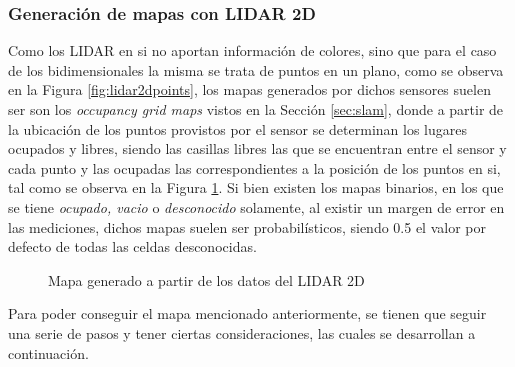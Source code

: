 \subsubsection{Generación de mapas con LIDAR 2D}
Como los LIDAR en si no aportan información de colores, sino que para el caso de los bidimensionales la misma se trata de puntos en un plano, como se observa en la Figura \ref{fig:lidar2dpoints}, los mapas generados por dichos sensores suelen ser son los \textit{occupancy grid maps} vistos en la Sección \ref{sec:slam}, donde a partir de la ubicación de los puntos provistos por el sensor se determinan los lugares ocupados y libres, siendo las casillas libres las que se encuentran entre el sensor y cada punto y las ocupadas las correspondientes a la posición de los puntos en si, tal como se observa en la Figura \ref{fig:lidar2dmap}. Si bien existen los mapas binarios, en los que se tiene \textit{ocupado, vacio} o \textit{desconocido} solamente, al existir un margen de error en las mediciones, dichos mapas suelen ser probabilísticos, siendo 0.5 el valor por defecto de todas las celdas desconocidas.

\begin{figure}[!ht]
    \caption{Mapa generado a partir de los datos del LIDAR 2D}
    \label{fig:lidar2dmap}
\end{figure}

Para poder conseguir el mapa mencionado anteriormente, se tienen que seguir una serie de pasos y tener ciertas consideraciones, las cuales se desarrollan a continuación.

